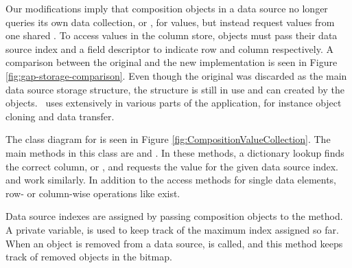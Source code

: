Our modifications imply that composition objects in a data source no longer queries its own data collection, or , for values, but instead request values from one shared . To access values in the column store, objects must pass their data source index and a field descriptor to indicate row and column respectively. A comparison between the original and the new implementation is seen in Figure \ref{fig:gap-storage-comparison}. Even though the original  was discarded as the main data source storage structure, the structure is still in use and can created by the objects. \gap~uses  extensively in various parts of the application, for instance object cloning and data transfer. 


The class diagram for  is seen in Figure \ref{fig:CompositionValueCollection}. The main methods in this class are  and . In these methods, a dictionary lookup finds the correct column, or , and requests the value for the given data source index.  and  work similarly. In addition to the access methods for single data elements, row- or column-wise operations like  exist. 

Data source indexes are assigned by passing composition objects to the  method. A private variable,  is used to keep track of the maximum index assigned so far. When an object is removed from a data source,  is called, and this method keeps track of removed objects in the  bitmap.



